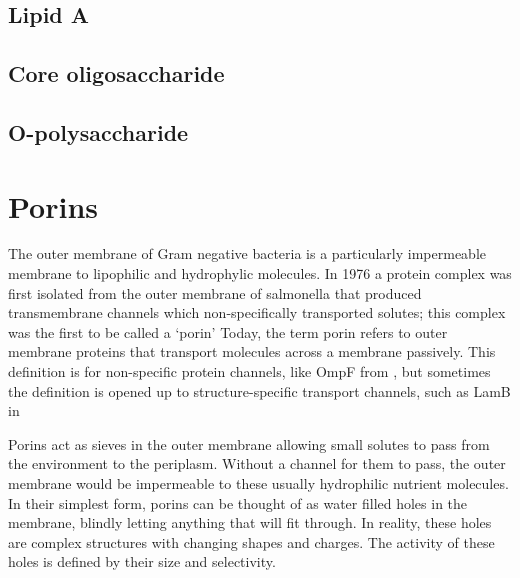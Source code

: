   \subsection{Lipid A}\label{sec:lipidA-intro}

  \subsection{Core oligosaccharide}\label{sec:core-oligosaccharide-intro}

  \subsection{O-polysaccharide}\label{sec:o-polysaccharide}

  \section{Porins} \label{sec:intro-porins}   
 
The outer membrane of Gram negative bacteria is a particularly impermeable membrane to lipophilic and hydrophylic molecules. In 1976 a protein complex was first isolated from the outer membrane of \ac{salmonella} that produced transmembrane channels which non-specifically transported solutes; this complex was the first to be called a `porin' Today, the term porin refers to outer membrane proteins that transport molecules across a membrane passively. This definition is for non-specific protein channels, like OmpF from \ecoli{}, but sometimes the definition is opened up to structure-specific transport channels, such as LamB in \ecoli{} 

Porins act as sieves in the outer membrane allowing small solutes to pass from the environment to the periplasm. Without a channel for them to pass, the outer membrane would be impermeable to these usually hydrophilic nutrient molecules. In their simplest form, porins can be thought of as water filled holes in the membrane, blindly letting anything that will fit through. In reality, these holes are complex structures with changing shapes and charges. The activity of these holes is defined by their size and selectivity.

